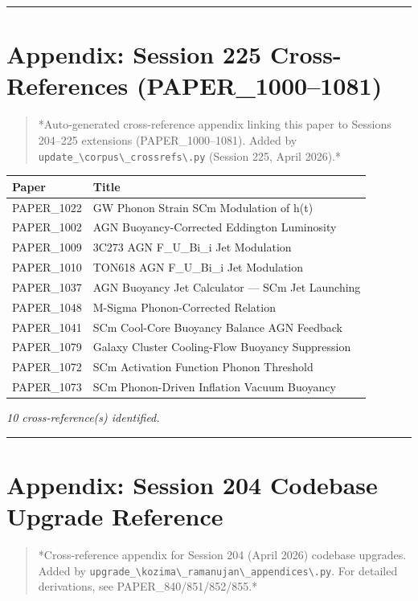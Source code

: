 \documentclass[12pt,a4paper]{article}
\begin{document}
\medskip\hrule\medskip

\section{Appendix: Session 225 Cross-References (PAPER\_1000--1081)}

\begin{quote}
*Auto-generated cross-reference appendix linking this paper to
Sessions 204--225 extensions (PAPER\_1000--1081). Added by
\texttt{update\_\textbackslash {corpus\textbackslash \_crossrefs\textbackslash }.py} (Session 225, April 2026).*
\end{quote}

\begin{table}[H]
\centering
\small
\begin{tabularx}{\linewidth}{@{}>{\raggedright\arraybackslash}X>{\raggedright\arraybackslash}X@{}}
\toprule
Paper & Title \tabularnewline
\midrule
PAPER\_1022 & GW Phonon Strain SCm Modulation of h(t) \tabularnewline
PAPER\_1002 & AGN Buoyancy-Corrected Eddington Luminosity \tabularnewline
PAPER\_1009 & 3C273 AGN F\_{U\_Bi\_i} Jet Modulation \tabularnewline
PAPER\_1010 & TON618 AGN F\_{U\_Bi\_i} Jet Modulation \tabularnewline
PAPER\_1037 & AGN Buoyancy Jet Calculator --- SCm Jet Launching \tabularnewline
PAPER\_1048 & M-Sigma Phonon-Corrected Relation \tabularnewline
PAPER\_1041 & SCm Cool-Core Buoyancy Balance AGN Feedback \tabularnewline
PAPER\_1079 & Galaxy Cluster Cooling-Flow Buoyancy Suppression \tabularnewline
PAPER\_1072 & SCm Activation Function Phonon Threshold \tabularnewline
PAPER\_1073 & SCm Phonon-Driven Inflation Vacuum Buoyancy \tabularnewline
\bottomrule
\end{tabularx}
\end{table}

\emph{10 cross-reference(s) identified.}

\medskip\hrule\medskip

\section{Appendix: Session 204 Codebase Upgrade Reference}

\begin{quote}
*Cross-reference appendix for Session 204 (April 2026) codebase upgrades.
Added by \texttt{upgrade\_\textbackslash {kozima\textbackslash \_ramanujan\textbackslash \_appendices\textbackslash }.py}. For detailed derivations,
see PAPER\_840/851/852/855.*
\end{quote}
\end{document}
